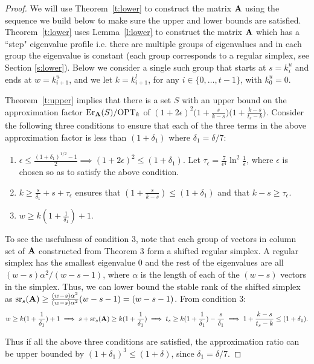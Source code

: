 \documentclass{article}
\begin{document}
\begin{proof}
We will use Theorem~\ref{t:lower} to construct the matrix $\mathbf A$ using
the sequence we build below to make sure the upper and lower bounds
are satisfied. Theorem~\ref{t:lower} uses Lemma~\ref{l:lower} to
construct the matrix $\mathbf A$ which has a ``step" eigenvalue profile
i.e. there are multiple groups of eigenvalues and in each group the
eigenvalue is constant (each group corresponds to a regular simplex, see
Section \ref{s:lower}). Below we consider a single such group that
starts at $s = k^u_i$ and ends at $w=k^u_{i+1}$, and we let $k = k^l_{i+1}$,
for any $i \in \{0,\ldots,t-1\}$, with $k^u_0=0$.   

Theorem~\ref{t:upper} implies that there is a set $S$ with an upper bound on the
approximation factor $\mathrm{Er}_\mathbf A(S)/\text{OPT}_k$ of
$(1+2\epsilon)^2\big(1+ \frac{s}{k-s}\big)\big( 1+ \frac{k-s}{t_s-
    k } \big)$. Consider the following three conditions to ensure that each
of the three terms in the above approximation factor is less than $(1+\delta_1)$ where $\delta_1 =
\delta/7$: 

\begin{enumerate}
\item $\epsilon \leq \frac{ (1+\delta_1 )^{1/2} - 1}{2} \implies
  (1+2\epsilon)^2 \leq (1+\delta_1) $. Let $\tau_\epsilon =
  \frac{7}{\epsilon^4} \ln^2 \frac{1}{\epsilon}$, where $\epsilon$ is
  chosen so as to satisfy the above condition. 
\item  $k \geq \frac{s}{\delta_1} + s + \tau_\epsilon$ ensures that $(1+\frac{s}{k-s}) \leq (1+\delta_1)$ and that $k-s \geq \tau_\epsilon$.
\item $w \geq k(1+\frac{1}{\delta_1}) +1$.
  \end{enumerate}
  To see the usefulness of condition 3, note that each group of
  vectors in column set of  $\mathbf A$ constructed from Theorem 3 form a
  shifted regular simplex. A regular simplex has the smallest
  eigenvalue $0$ and the rest of the eigenvalues are all $(w-s)
  \alpha^2/(w-s-1)$, where $\alpha$ is the length of each of the
  $(w-s)$ vectors in the simplex. Thus, we can lower bound the stable
  rank of the shifted simplex as ${\mathrm{sr}}_s(\mathbf A) \geq
  \frac{(w-s)\alpha^2}{(w-s) \alpha^2} (w-s-1) = (w-s-1)$. From
  condition 3: 
  \[  w \geq k(1+\frac{1}{\delta_1}) +1  \implies s + {\mathrm{sr}}_s(\mathbf A) \geq k(1+\frac{1}{\delta_1}) \implies t_s \geq k(1+\frac{1}{\delta_1}) -\frac{s}{\delta_1} \implies 1+ \frac{k-s}{t_s-k}  \leq (1+\delta_1).\]	

Thus if all the above three conditions are satisfied, the approximation ratio can be upper bounded by $(1+\delta_1)^3 \leq (1+\delta)$, since $\delta_1 = \delta/7$.


\end{proof}
\end{document}
